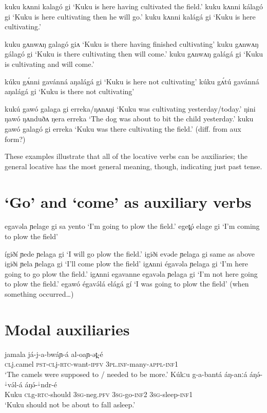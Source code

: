 kuku kʌnni kalagó gi			‘Kuku is here having cultivated the field.’
kuku kʌnni kálagó gi			‘Kuku is here cultivating then he will go.’
kuku kʌnni kalágá gi			‘Kuku is here cultivating.’

kuku gʌnwʌŋ galagó giʌ		‘Kuku is there having finished cultivating’
kuku gʌnwʌŋ gálagó gi		‘Kuku is there cultivating then will come.’
kuku gʌnwʌŋ galágá gi		‘Kuku is cultivating and will come.’

kúku gʌ́nni gavánná aŋalágá gi	‘Kuku is here not cultivating’ 
kúku gʌ́tú gavánná aŋalágá gi	‘Kuku is there not cultivating’ 

kukú gawó galaga gi erreka/ŋʌnʌŋi	‘Kuku was cultivating yesterday/today.’
ŋini ŋawó ŋʌnduðʌ ŋera erreka	‘The dog was about to bit the child yesterday.’
kuku gawó galagó gi erreka		‘Kuku was there cultivating the field.’ (diff. from aux form?)

These examples illustrate that all of the locative verbs can be auxiliaries; the general locative has the most general meaning, though, indicating just past tense.


\section{`Go' and `come' as auxiliary verbs}\label{sec:ch14:goaux}

egavəla ɲelage gi sa yento		‘I’m going to plow the field.’
eget̪ó elage gi				‘I’m coming to plow the field’

ígiðí ɲede ɲelaga gi			‘I will go plow the field.’
igiði evəde ɲelaga gi			same as above
igiði ɲela ɲelaga gi			‘I’ll come plow the field’
igʌnni égavəla ɲelaga gi		‘I’m here going to go plow the field.’
igʌnni egavanne egavəla ɲelaga gi	‘I’m not here going to plow the field.’
egawó égavə́lá elágá gí		‘I was going to plow the field’ (when something occurred…)



\section{Modal auxiliaries}

\ea \gll  jamala já-j-a-bwáɲ-á al-oaɲ-ət̪-é		\\	
\textsc{cl}j.camel \textsc{pst}-\textsc{cl}j-\textsc{rtc}-want-\textsc{ipfv} \textsc{3pl.inf}-many-\textsc{appl}-\textsc{inf1}\\
\glt ‘The camels were supposed to / needed to be more.’
\ex \gll  Kúkːu g-a-bantá áŋ-anːá áŋə́-$^{↓}$və́l-á áŋə́-$^{↓}$ndr-é\\	
Kuku \textsc{cl}g-\textsc{rtc}-should  \textsc{3sg}-neg.\textsc{pfv}  \textsc{3sg}-go-\textsc{inf2}  \textsc{3sg}-sleep-\textsc{inf1}  \\
\glt `Kuku should not be about to fall asleep.'
\z 

